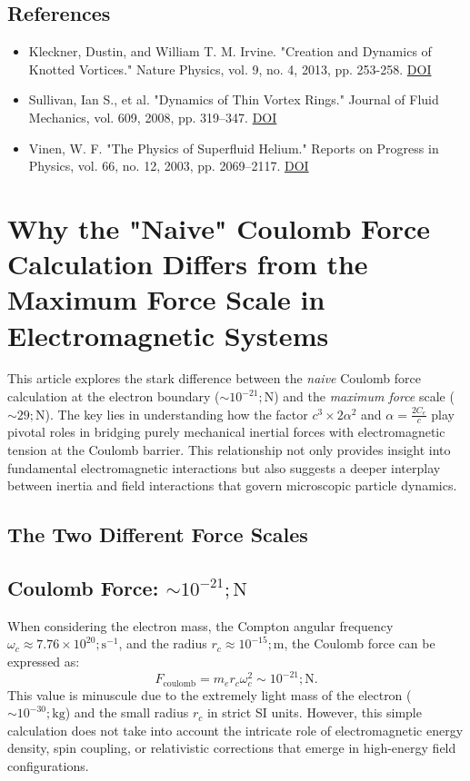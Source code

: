 \documentclass[a4paper,10pt]{article}
\begin{document}
    \subsection*{References}
    \begin{itemize}
        \item Kleckner, Dustin, and William T. M. Irvine. "Creation and Dynamics of Knotted Vortices." Nature Physics, vol. 9, no. 4, 2013, pp. 253-258. \href{https://doi.org/10.1038/NPHYS2560}{DOI}
        \item Sullivan, Ian S., et al. "Dynamics of Thin Vortex Rings." Journal of Fluid Mechanics, vol. 609, 2008, pp. 319–347. \href{https://doi.org/10.1017/S0022112008002292}{DOI}
        \item Vinen, W. F. "The Physics of Superfluid Helium." Reports on Progress in Physics, vol. 66, no. 12, 2003, pp. 2069–2117. \href{https://doi.org/10.1088/0034-4885/66/12/R01}{DOI}
    \end{itemize}


    
\section{Why the "Naive" Coulomb Force Calculation Differs from the Maximum Force Scale in Electromagnetic Systems}


This article explores the stark difference between the \textit{naive} Coulomb force calculation at the electron boundary ($\sim 10^{-21} ; \mathrm{N}$) and the \textit{maximum force} scale ($\sim 29 ; \mathrm{N}$). The key lies in understanding how the factor $c^3 \times 2 \alpha^2$ and $\alpha = \frac{2C_e}{c}$ play pivotal roles in bridging purely mechanical inertial forces with electromagnetic tension at the Coulomb barrier. This relationship not only provides insight into fundamental electromagnetic interactions but also suggests a deeper interplay between inertia and field interactions that govern microscopic particle dynamics.


\subsection*{The Two Different Force Scales}


\subsection*{Coulomb Force: $\sim 10^{-21} ; \mathrm{N}$}


When considering the electron mass, the Compton angular frequency $\omega_c \approx 7.76 \times 10^{20} ; \mathrm{s^{-1}}$, and the radius $r_c \approx 10^{-15} ; \mathrm{m}$, the Coulomb force can be expressed as:
\begin{equation*}
F_\text{coulomb} = m_e r_c \omega_c^2 \sim 10^{-21} ; \mathrm{N}.
\end{equation*}
This value is minuscule due to the extremely light mass of the electron ($\sim 10^{-30} ; \mathrm{kg}$) and the small radius $r_c$ in strict SI units. However, this simple calculation does not take into account the intricate role of electromagnetic energy density, spin coupling, or relativistic corrections that emerge in high-energy field configurations.
\end{document}

